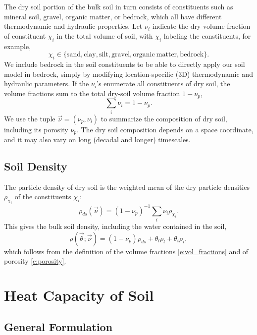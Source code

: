 \documentclass[twoside,10pt]{report}
\begin{document}
The dry soil portion of the bulk soil in turn consists of constituents such as mineral soil, gravel, organic matter, or bedrock, which all have different thermodynamic and hydraulic properties.  Let $\nu_{i}$ indicate the dry volume fraction of constituent $\chi_i$ in the total volume of soil, with $\chi_i$ labeling the constituents, for example,
\[
\chi_i \in \{ {\mathrm{sand}}, {\mathrm{clay}}, {\mathrm{silt}}, {\mathrm{gravel}}, \mathrm{organic~matter}, {\mathrm{bedrock}} \}.
\]
We include bedrock in the soil constituents to be able to directly apply our soil model in bedrock, simply by modifying location-specific (3D) thermodynamic and hydraulic parameters. If the $\nu_i$'s enumerate all constituents of dry soil, the volume fractions sum to the total dry-soil volume fraction $1-\nu_p$,
\[
\sum_i \nu_{i} = 1-\nu_p.
\] 
We use the tuple $\vec{\nu} = (\nu_p, \nu_i)$ to summarize the composition of dry soil, including its porosity $\nu_p$. The dry soil composition depends on a space coordinate, and it may also vary on long (decadal and longer) timescales.

\subsection{Soil Density}

The particle density of dry soil is the weighted mean of the dry particle densities $\rho_{\chi_i}$ of the constituents $\chi_i$:
\begin{equation}\label{d:dry_soil_density}
    \rho_{ds}(\vec{\nu})  = (1-\nu_p)^{-1} \sum_i \nu_{i} {\rho}_{\chi_i}.
\end{equation}
This gives the bulk soil density, including the water contained in the soil,  
\begin{equation}\label{e:bulk_density}
\rho (\vec{\theta}; \vec{\nu}) = (1-\nu_p) \rho_{ds} + \theta_l \rho_l + \theta_i \rho_i,
\end{equation}
which follows from the definition of the volume fractions \eqref{e:vol_fractions} and of porosity \eqref{e:porosity}. 

\section{Heat Capacity of Soil}

\subsection{General Formulation}
\end{document}
